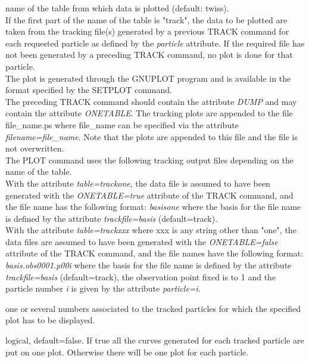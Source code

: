 \begin{madlist}
    name of the table from which data is plotted (default:
     twiss). \\ 
     If the first part of the name of the table is "track", the
     data to be plotted are taken from the tracking file(s) generated by
     a previous TRACK command for each requested particle as defined by
     the \textit{particle} attribute. If the required file has not been
     generated by a preceding TRACK command, no plot is done for that
     particle. \\  
     The plot is generated through the GNUPLOT program and is available
     in the format specified by the SETPLOT command. \\ 
     The preceding TRACK command should contain the attribute \textit{DUMP}
     and may contain the attribute \textit{ONETABLE}. The tracking plots
     are appended to the file file\_name.ps where file\_name can be
     specified via the attribute \textit{filename=file\_name}. Note that
     the plots are appended to this file and the file is not
     overwritten. \\
     The PLOT command uses the following tracking output files depending on
     the name of the table.\\  
     With the attribute \textit{table=trackone}, the data file is assumed
     to have been generated with the \textit{ONETABLE=true} attribute of
     the TRACK command, and the file name has the following format: 
     \textit{basisone} where the basis for the file name is defined by the
     attribute \textit{trackfile=basis} (default=track).\\
     With the attribute \textit{table=trackxxx} where xxx is any string
     other than "one", the data files are assumed to have been generated
     with the \textit{ONETABLE=false} attribute of the TRACK command, and
     the file names have the following format: \textit{basis.obs0001.p00i}
     where the basis for the file name is defined by the attribute
     \textit{trackfile=basis} (default=track), the observation point fixed
     is to 1 and the particle number \textit{i} is given by the attribute
     \textit{particle=i}.
 
    one or several numbers associated to the tracked
     particles for which the specified plot has to be displayed.  

    logical, default=false. If true all the curves
     generated for each tracked particle are put on one plot. Otherwise
     there will be one plot for each particle.   


\end{madlist}
